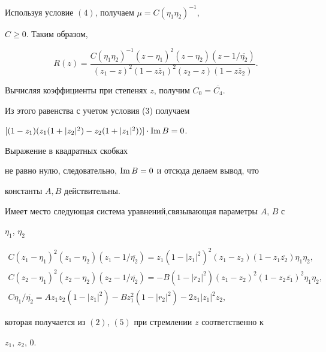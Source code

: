 Используя условие $(4)$, получаем $\mu=C(\eta_1\eta_2)^{-1}$,


$C\ge 0$. Таким образом,


\begin{equation}


R(z) =\frac {C(\eta_1\eta_2)^{-1}(z-\eta_1)^2(z-\eta_2)


(z-1/\overline{\eta_2})}{(z_1-z)^2(1-z\overline z_1)^2(z_2-z)


(1-z\overline z_2)}.


\end{equation}


Вычисляя коэффициенты при степенях $z$, получим $C_0=\overline{C_4}$.


Из этого равенства с учетом условия (3) получаем


$[(1 -z_1)(z_1(1+|z_2|^2)-z_2(1+|z_1|^2))]\cdot\operatorname{Im} B=0$.


Выражение в квадратных скобках


не равно нулю, следовательно, $\operatorname{Im} B=0$ и отсюда делаем вывод, что


константы $A,B$ действительны.





Имеет место следующая система уравнений,связывающая параметры $A$, $B$ с


$\eta_1$, $\eta_2$


\begin{gather}


C(z_1-\eta_1)^2(z_1-\eta_2)(z_1-


1/\overline{\eta_2}) =z_1(1-|z_1|^2)^2(z_1-z_2)


(1-z_1\overline{z_2})\eta_1\eta_2, \\


%


C(z_2-\eta_1)^2(z_2-\eta_2)(z_2- 1/\overline{\eta_2})


=-B(1- |r_2|^2)(z_1-z_2)^2(1-z_2\overline{z_1} )^2\eta_1\eta_2, \\


%


C\eta_1/ \overline{\eta_2}=Az_1z_2(1-|z_1|^2)-Bz_1^2(1-|r_2|^2)


- 2z_1|z_1|^2z_2,


\end{gather}


которая получается из $(2)$, $(5)$ при стремлении $z$ соответственно к


$z_1$, $z_2$, 0.





